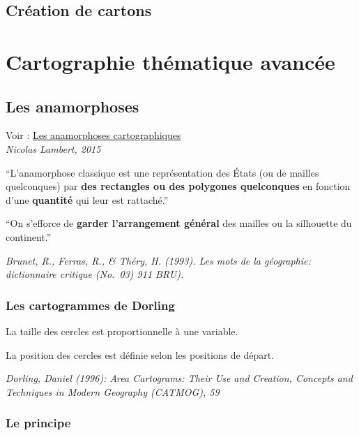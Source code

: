 \documentclass[]{book}
\begin{document}
\hypertarget{creation-de-cartons}{%
\section{Création de cartons}\label{creation-de-cartons}}

\hypertarget{jour3}{%
\chapter{Cartographie thématique avancée}\label{jour3}}

\hypertarget{les-anamorphoses}{%
\section{Les anamorphoses}\label{les-anamorphoses}}

Voir : \href{https://neocarto.hypotheses.org/366}{Les anamorphoses cartographiques}\\
\emph{Nicolas Lambert, 2015}

``L'anamorphose classique est une représentation des États (ou de mailles quelconques) par \textbf{des rectangles ou des polygones quelconques} en fonction d'une \textbf{quantité} qui leur est rattaché.''

``On s'efforce de \textbf{garder l'arrangement général} des mailles ou la silhouette du continent.''

\emph{Brunet, R., Ferras, R., \& Théry, H. (1993). Les mots de la géographie: dictionnaire critique (No.~03) 911 BRU).}

\hypertarget{les-cartogrammes-de-dorling}{%
\subsection{Les cartogrammes de Dorling}\label{les-cartogrammes-de-dorling}}

La taille des cercles est proportionnelle à une variable.

La position des cercles est définie selon les positions de départ.

\emph{Dorling, Daniel (1996): Area Cartograms: Their Use and Creation, Concepts and Techniques in Modern Geography (CATMOG), 59}

\hypertarget{le-principe}{%
\subsection{Le principe}\label{le-principe}}
\end{document}

